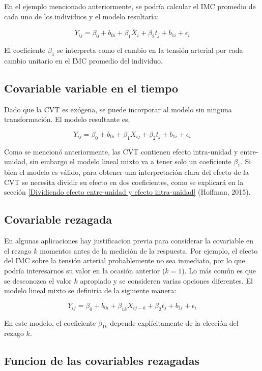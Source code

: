 \documentclass[spanish]{article}
\numberwithin{figure}{subsection}
\numberwithin{equation}{subsection}
\numberwithin{table}{subsection}
\begin{document}
En el ejemplo mencionado anteriormente, se podría calcular el IMC promedio de
cada uno de los individuos y el modelo resultaría:

\[ Y_{ij} = \beta_0 + b_{0i} + \beta_1 \overline{X}_i + \beta_2 t_j + b_{1i} + \epsilon_{i} \]

El coeficiente $\beta_1$ se interpreta como el cambio en la tensión arterial por
cada cambio unitario en el IMC promedio del individuo.

\subsection{Covariable variable en el tiempo}

Dado que la CVT es exógena, se puede incorporar al modelo sin ninguna
transformación. El modelo resultante es,

\[ Y_{ij} = \beta_0 + b_{0i} + \beta_1 X_{ij} + \beta_2 t_j + b_{1i} + \epsilon_{i} \]

Como se mencionó anteriormente, las CVT contienen efecto intra-unidad y
entre-unidad, sin embargo el modelo lineal mixto va a tener solo un coeficiente
$\beta_1$. Si bien el modelo es válido, para obtener una interpretación clara
del efecto de la CVT se necesita dividir su efecto en dos coeficientes, como se
explicará en la sección \ref{Dividiendo efecto entre-unidad y efecto
intra-unidad} (Hoffman, 2015).


\subsection{Covariable rezagada}

En algunas aplicaciones hay justificacion previa para considerar la covariable
en el rezago $k$ momentos antes de la medición de la respuesta. Por ejemplo, el
efecto del IMC sobre la tensión arterial probablemente no sea inmediato, por lo
que podría interesarnos su valor en la ocasión anterior ($k=1$). Lo más común es
que se desconozca el valor $k$ apropiado y se consideren varias opciones
diferentes. El modelo lineal mixto se definiría de la siguiente manera:

\[ Y_{ij} = \beta_0 + b_{0i} + \beta_{1k} X_{ij-k} + \beta_2 t_j + b_{1i} + \epsilon_{i} \]

En este modelo, el coeficiente $\beta_{1k}$ depende explícitamente de la
elección del rezago $k$.

\subsection{Funcion de las covariables rezagadas}
\end{document}
